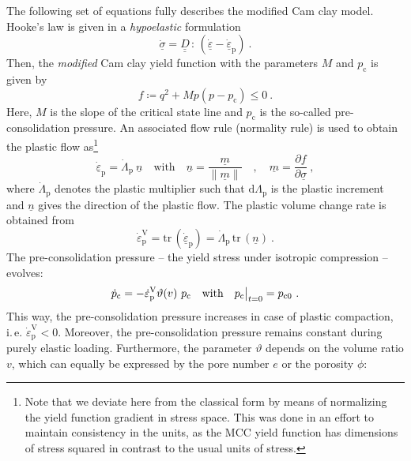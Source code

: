 \documentclass[paper=a4, twoside, pagesize]{scrartcl}
\newcommand{\tensor}[1]{\underline{#1}}
\newcommand{\tensorf}[1]{\underline{\underline{#1}}}
\newcommand{\ppkt}{\,\colon\,}
\renewcommand{\c}{\text{c}}
\renewcommand{\d}{\text{d}}
\newcommand{\p}{\text{p}}
\newcommand{\with}{\text{with}}
\newcommand{\trace}{\mathrm{tr}\,}
\newcommand{\minus}{-}
\begin{document}
The following set of equations fully describes the modified Cam clay model. Hooke's law is given in a \emph{hypoelastic} formulation
\begin{equation}\label{eq:linearHypoElasticity}
  \dot{\tensor\sigma} = \tensorf D\ppkt\left(\dot{\tensor\varepsilon} - \dot{\tensor\varepsilon}_\p \right) \ .
\end{equation}
Then, the \emph{modified} Cam clay yield function with the parameters $M$ and $p_\c$ is given by
\begin{equation}
  f \coloneqq q^2 + M p(p-p_\c) \leq 0 \ .
\end{equation}
Here, $M$ is the slope of the critical state line and $p_\c$ is the so-called pre-consolidation pressure.
An associated flow rule (normality rule) is used to obtain the plastic flow as\footnote{Note that we deviate here from the classical form by means of normalizing the yield function gradient in stress space. This was done in an effort to maintain consistency in the units, as the MCC yield function has dimensions of stress squared in contrast to the usual units of stress.}
\begin{equation}\label{eq:flowRule}
  \dot{\tensor\varepsilon}_\p = \dot{\varLambda}_\p\ \tensor n \quad\with\quad \tensor n =\frac{\tensor m}{\|\tensor m\|} \quad,\quad \tensor m = \frac{\partial f}{\partial \tensor\sigma} \ ,
\end{equation}
where $\dot{\varLambda}_\p$ denotes the plastic multiplier such that $\d{\varLambda}_\p$ is the plastic increment and $\tensor n$ gives the direction of the plastic flow. The plastic volume change rate is obtained from
\begin{equation}
  \dot{\varepsilon}_\p^\text{V} = \trace(\dot{\tensor\varepsilon}_\p) = \dot{\varLambda}_\p\,\trace(\tensor n)\ . %
\end{equation}
The pre-consolidation pressure -- the yield stress under isotropic compression -- evolves:
\begin{equation}\label{eq:evolutionPc}
  \dot{p}_\c = \minus\dot{\varepsilon}_\p^\text{V} \vartheta(v)\ p_\c \quad\with\quad p_\c\big{|}_{t=0} = p_{\c 0} \ .
\end{equation}
This way, the pre-consolidation pressure increases in case of plastic compaction, i.\,e. $\dot{\varepsilon}_\p^\text{V}<0$. Moreover, the pre-consolidation pressure remains constant during purely elastic loading. Furthermore, the parameter $\vartheta$ depends on the volume ratio $v$, which can equally be expressed by the pore number $e$ or the porosity $\phi$:
\end{document}

